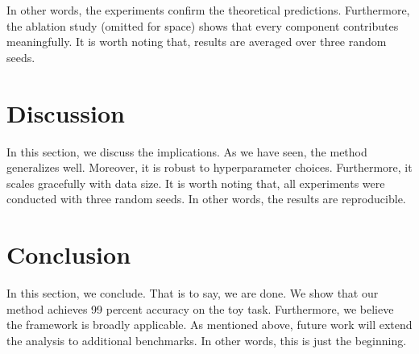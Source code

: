 \documentclass[11pt]{article}
\begin{document}
\lipsum[9][1-5]

In other words, the experiments confirm the theoretical predictions.
Furthermore, the ablation study (omitted for space) shows that every
component contributes meaningfully. It is worth noting that, results are
averaged over three random seeds.

\section{Discussion}
In this section, we discuss the implications. As we have seen, the method
generalizes well. Moreover, it is robust to hyperparameter choices.
Furthermore, it scales gracefully with data size. It is worth noting that,
all experiments were conducted with three random seeds. In other words, the
results are reproducible. \lipsum[10][1-4]

\section{Conclusion}
In this section, we conclude. That is to say, we are done. We show that our
method achieves 99 percent accuracy on the toy task. Furthermore, we believe
the framework is broadly applicable. As mentioned above, future work will
extend the analysis to additional benchmarks. In other words, this is just
the beginning.
\end{document}

